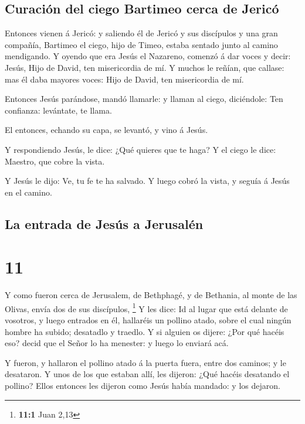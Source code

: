 \hypertarget{curaciuxf3n-del-ciego-bartimeo-cerca-de-jericuxf3}{%
\subsection{Curación del ciego Bartimeo cerca de
Jericó}\label{curaciuxf3n-del-ciego-bartimeo-cerca-de-jericuxf3}}

 Entonces vienen á Jericó: y saliendo él de Jericó y sus
discípulos y una gran compañía, Bartimeo el ciego, hijo de Timeo, estaba
sentado junto al camino mendigando.  Y oyendo que era
Jesús el Nazareno, comenzó á dar voces y decir: Jesús, Hijo de David,
ten misericordia de mí.  Y muchos le reñían, que callase:
mas él daba mayores voces: Hijo de David, ten misericordia de mí.

 Entonces Jesús parándose, mandó llamarle: y llaman al
ciego, diciéndole: Ten confianza: levántate, te llama.

 El entonces, echando su capa, se levantó, y vino á
Jesús.

 Y respondiendo Jesús, le dice: ¿Qué quieres que te haga?
Y el ciego le dice: Maestro, que cobre la vista.

 Y Jesús le dijo: Ve, tu fe te ha salvado. Y luego cobró
la vista, y seguía á Jesús en el camino.

\hypertarget{la-entrada-de-jesuxfas-a-jerusaluxe9n}{%
\subsection{La entrada de Jesús a
Jerusalén}\label{la-entrada-de-jesuxfas-a-jerusaluxe9n}}

\hypertarget{section-10}{%
\section{11}\label{section-10}}

 Y como fueron cerca de Jerusalem, de Bethphagé, y de
Bethania, al monte de las Olivas, envía dos de sus discípulos,
\footnote{\textbf{11:1} Juan 2,13}  Y les dice: Id al
lugar que está delante de vosotros, y luego entrados en él, hallaréis un
pollino atado, sobre el cual ningún hombre ha subido; desatadlo y
traedlo.  Y si alguien os dijere: ¿Por qué hacéis eso?
decid que el Señor lo ha menester: y luego lo enviará acá.

 Y fueron, y hallaron el pollino atado á la puerta fuera,
entre dos caminos; y le desataron.  Y unos de los que
estaban allí, les dijeron: ¿Qué hacéis desatando el pollino?
 Ellos entonces les dijeron como Jesús había mandado: y
los dejaron.

